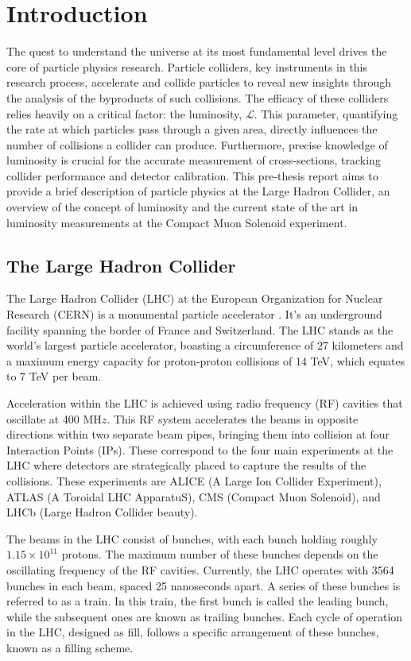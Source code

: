 \section{Introduction}

The quest to understand the universe at its most fundamental level drives the core of particle physics research. Particle colliders, key instruments in this research process, accelerate and collide particles to reveal new insights through the analysis of the byproducts of such collisions. The efficacy of these colliders relies heavily on a critical factor: the luminosity, $\mathcal{L}$. This parameter, quantifying the rate at which particles pass through a given area, directly influences the number of collisions a collider can produce. Furthermore, precise knowledge of luminosity is crucial for the accurate measurement of cross-sections, tracking collider performance and detector calibration. This pre-thesis report aims to provide a brief description of particle physics at the Large Hadron Collider, an overview of the concept of luminosity and the current state of the art in luminosity measurements at the Compact Muon Solenoid experiment.

\subsection{The Large Hadron Collider}
\label{subsec:lhc}

The Large Hadron Collider (LHC) at the European Organization for Nuclear Research (CERN) is a monumental particle accelerator \cite{lhc}. It's an underground facility spanning the border of France and Switzerland. The LHC stands as the world's largest particle accelerator, boasting a circumference of 27 kilometers and a maximum energy capacity for proton-proton collisions of 14 TeV, which equates to 7 TeV per beam.

Acceleration within the LHC is achieved using radio frequency (RF) cavities that oscillate at 400 MH$z$. This RF system accelerates the beams in opposite directions within two separate beam pipes, bringing them into collision at four Interaction Points (IPs). These correspond to the four main experiments at the LHC where detectors are strategically placed to capture the results of the collisions. These experiments are ALICE (A Large Ion Collider Experiment), ATLAS (A Toroidal LHC ApparatuS), CMS (Compact Muon Solenoid), and LHCb (Large Hadron Collider beauty).


The beams in the LHC consist of bunches, with each bunch holding roughly $1.15 \times 10^{11}$ protons. The maximum number of these bunches depends on the oscillating frequency of the RF cavities. Currently, the LHC operates with 3564 bunches in each beam, spaced 25 nanoseconds apart. A series of these bunches is referred to as a train. In this train, the first bunch is called the leading bunch, while the subsequent ones are known as trailing bunches. Each cycle of operation in the LHC, designed as fill, follows a specific arrangement of these bunches, known as a filling scheme.

